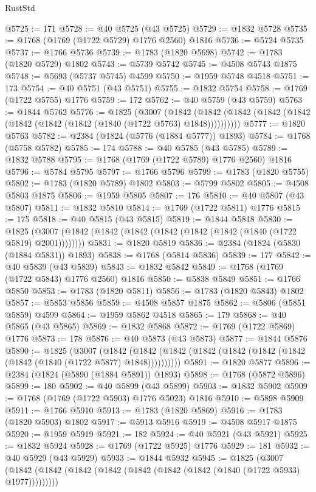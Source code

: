 \begin{lexlean}{RustStd}
\begin{coremodule}
@5725 := 171
@5728 := @40 @5725 (@43 @5725)
@5729 := @1832 @5728
@5735 := @1768 (@1769 (@1722 @5729) @1776 @2560) @1816
@5736 := @5724 @5735
@5737 := @1766 @5736
@5739 := @1783 (@1820 @5698)
@5742 := @1783 (@1820 @5729) @1802
@5743 := @5739 @5742
@5745 := @4508 @5743 @1875
@5748 := @5693 (@5737 @5745) @4599
@5750 := @1959 @5748 @4518
@5751 := 173
@5754 := @40 @5751 (@43 @5751)
@5755 := @1832 @5754
@5758 := @1769 (@1722 @5755) @1776
@5759 := 172
@5762 := @40 @5759 (@43 @5759)
@5763 := @1844 @5762
@5776 := @1825
    (@3007
      (@1842 (@1842 (@1842 (@1842 (@1842 (@1842 (@1842 (@1842 (@1840 (@1722 @5763) @1848))))))))))
@5777 := @1820 @5763
@5782 := @2384 (@1824 (@5776 (@1884 @5777)) @1893)
@5784 := @1768 (@5758 @5782)
@5785 := 174
@5788 := @40 @5785 (@43 @5785)
@5789 := @1832 @5788
@5795 := @1768 (@1769 (@1722 @5789) @1776 @2560) @1816
@5796 := @5784 @5795
@5797 := @1766 @5796
@5799 := @1783 (@1820 @5755)
@5802 := @1783 (@1820 @5789) @1802
@5803 := @5799 @5802
@5805 := @4508 @5803 @1875
@5806 := @1959 @5805
@5807 := 176
@5810 := @40 @5807 (@43 @5807)
@5811 := @1832 @5810
@5814 := @1769 (@1722 @5811) @1776
@5815 := 175
@5818 := @40 @5815 (@43 @5815)
@5819 := @1844 @5818
@5830 := @1825 (@3007 (@1842 (@1842 (@1842 (@1842 (@1842 (@1842 (@1840 (@1722 @5819) @2001))))))))
@5831 := @1820 @5819
@5836 := @2384 (@1824 (@5830 (@1884 @5831)) @1893)
@5838 := @1768 (@5814 @5836)
@5839 := 177
@5842 := @40 @5839 (@43 @5839)
@5843 := @1832 @5842
@5849 := @1768 (@1769 (@1722 @5843) @1776 @2560) @1816
@5850 := @5838 @5849
@5851 := @1766 @5850
@5853 := @1783 (@1820 @5811)
@5856 := @1783 (@1820 @5843) @1802
@5857 := @5853 @5856
@5859 := @4508 @5857 @1875
@5862 := @5806 (@5851 @5859) @4599
@5864 := @1959 @5862 @4518
@5865 := 179
@5868 := @40 @5865 (@43 @5865)
@5869 := @1832 @5868
@5872 := @1769 (@1722 @5869) @1776
@5873 := 178
@5876 := @40 @5873 (@43 @5873)
@5877 := @1844 @5876
@5890 := @1825
    (@3007
      (@1842 (@1842 (@1842 (@1842 (@1842 (@1842 (@1842 (@1842 (@1840 (@1722 @5877) @1848))))))))))
@5891 := @1820 @5877
@5896 := @2384 (@1824 (@5890 (@1884 @5891)) @1893)
@5898 := @1768 (@5872 @5896)
@5899 := 180
@5902 := @40 @5899 (@43 @5899)
@5903 := @1832 @5902
@5909 := @1768 (@1769 (@1722 @5903) @1776 @5023) @1816
@5910 := @5898 @5909
@5911 := @1766 @5910
@5913 := @1783 (@1820 @5869)
@5916 := @1783 (@1820 @5903) @1802
@5917 := @5913 @5916
@5919 := @4508 @5917 @1875
@5920 := @1959 @5919
@5921 := 182
@5924 := @40 @5921 (@43 @5921)
@5925 := @1832 @5924
@5928 := @1769 (@1722 @5925) @1776
@5929 := 181
@5932 := @40 @5929 (@43 @5929)
@5933 := @1844 @5932
@5945 := @1825
    (@3007 (@1842 (@1842 (@1842 (@1842 (@1842 (@1842 (@1842 (@1840 (@1722 @5933) @1977)))))))))

\end{coremodule}
\end{lexlean}
